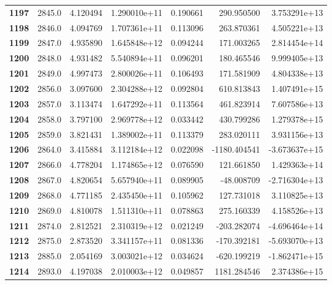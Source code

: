 \documentclass{report}[12pt]
\begin{document}
\begin{center}
\begin{tabular}{lrrrrrr}
\textbf{1197} &         2845.0 &   4.120494 &  1.290010e+11 &    0.190661 &   290.950500 &  3.753291e+13 \\
\textbf{1198} &         2846.0 &   4.094769 &  1.707361e+11 &    0.113096 &   263.870361 &  4.505221e+13 \\
\textbf{1199} &         2847.0 &   4.935890 &  1.645848e+12 &    0.094244 &   171.003265 &  2.814454e+14 \\
\textbf{1200} &         2848.0 &   4.931482 &  5.540894e+11 &    0.096201 &   180.465546 &  9.999405e+13 \\
\textbf{1201} &         2849.0 &   4.997473 &  2.800026e+11 &    0.106493 &   171.581909 &  4.804338e+13 \\
\textbf{1202} &         2856.0 &   3.097600 &  2.304288e+12 &    0.092804 &   610.813843 &  1.407491e+15 \\
\textbf{1203} &         2857.0 &   3.113474 &  1.647292e+11 &    0.113564 &   461.823914 &  7.607586e+13 \\
\textbf{1204} &         2858.0 &   3.797100 &  2.969778e+12 &    0.033442 &   430.799286 &  1.279378e+15 \\
\textbf{1205} &         2859.0 &   3.821431 &  1.389002e+11 &    0.113379 &   283.020111 &  3.931156e+13 \\
\textbf{1206} &         2864.0 &   3.415884 &  3.112184e+12 &    0.022098 & -1180.404541 & -3.673637e+15 \\
\textbf{1207} &         2866.0 &   4.778204 &  1.174865e+12 &    0.076590 &   121.661850 &  1.429363e+14 \\
\textbf{1208} &         2867.0 &   4.820654 &  5.657940e+11 &    0.089905 &   -48.008709 & -2.716304e+13 \\
\textbf{1209} &         2868.0 &   4.771185 &  2.435450e+11 &    0.105962 &   127.731018 &  3.110825e+13 \\
\textbf{1210} &         2869.0 &   4.810078 &  1.511310e+11 &    0.078863 &   275.160339 &  4.158526e+13 \\
\textbf{1211} &         2874.0 &   2.812521 &  2.310319e+12 &    0.021249 &  -203.282074 & -4.696464e+14 \\
\textbf{1212} &         2875.0 &   2.873520 &  3.341157e+11 &    0.081336 &  -170.392181 & -5.693070e+13 \\
\textbf{1213} &         2885.0 &   2.054169 &  3.003021e+12 &    0.034624 &  -620.199219 & -1.862471e+15 \\
\textbf{1214} &         2893.0 &   4.197038 &  2.010003e+12 &    0.049857 &  1181.284546 &  2.374386e+15 \\

\end{tabular}
\end{center}
\end{document}
